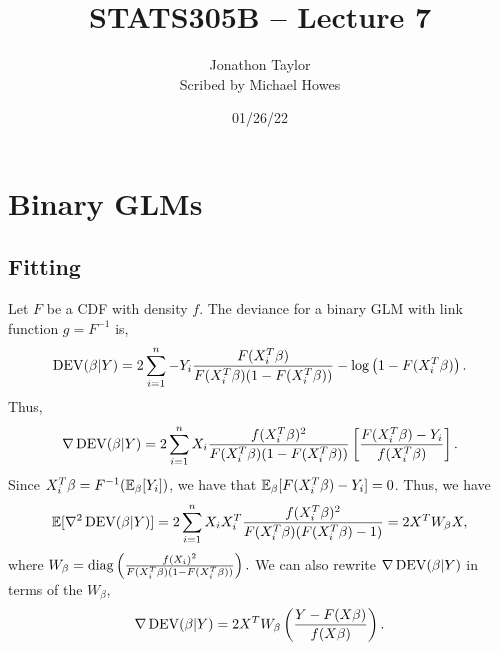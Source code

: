 




\title{STATS305B -- Lecture 7}
\author{Jonathon Taylor\\ Scribed by Michael Howes}
\date{01/26/22}

\pagestyle{fancy}
\fancyhf{}


\maketitle
\tableofcontents
\section{Binary GLMs}
\subsection{Fitting}
Let $F$ be a CDF with density $f$. The deviance for a binary GLM with link function $g=F^{-1}$ is,
\[\operatorname{DEV}(\beta|Y) = 2\sum_{i=1}^n - Y_i \frac{F(X_i^T\beta)}{F(X_i^T\beta)(1-F(X_i^T\beta))} - \log\left(1-F(X_i^T\beta)\right). \]
Thus, 
\[\nabla \operatorname{DEV}(\beta|Y) = 2\sum_{i=1}^n X_i \frac{f(X_i^T\beta)^2}{F(X_i^T\beta)(1-F(X_i^T\beta))}\left[\frac{F(X_i^T\beta)-Y_i}{f(X_i^T\beta)}\right]. \]
Since $X_i^T\beta = F^{-1}({\mathbb{E}}_\beta[Y_i])$, we have that ${\mathbb{E}}_\beta [F(X_i^T\beta)-Y_i] = 0$. Thus, we have
\[{\mathbb{E}}[\nabla^2 \operatorname{DEV}(\beta|Y)] = 2\sum_{i=1}^n X_iX_i^T\frac{f(X_i^T\beta)^2}{F(X_i^T\beta)(F(X_i^T\beta)-1)} = 2X^TW_\beta X, \]
where $W_\beta = \operatorname{diag}\left(\frac{f(X_i)^2}{F(X_i^T\beta)(1-F(X_i^T\beta))}\right).$ We can also rewrite $\nabla \operatorname{DEV}(\beta|Y)$ in terms of the $W_\beta$,
\[\nabla \operatorname{DEV}(\beta|Y) = 2X^TW_\beta \left(\frac{Y-F(X\beta)}{f(X\beta)}\right). \]
